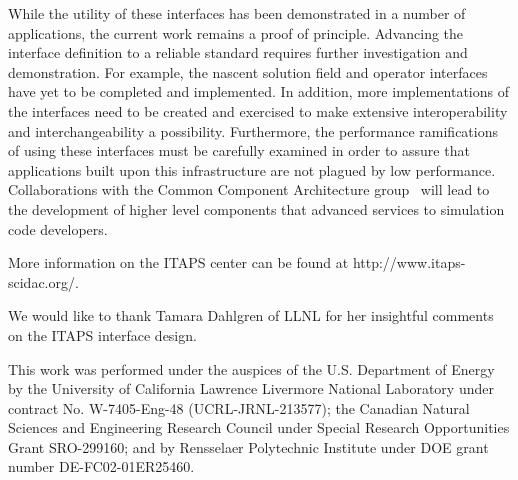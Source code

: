 \documentclass[global]{svjour}
\begin{document}
While the utility of these interfaces has been demonstrated in a
number of applications, the current work remains a proof of principle.
Advancing the interface definition to a reliable standard requires
further investigation and demonstration.  For example, the nascent
solution field and operator interfaces have yet to be completed and
implemented.  In addition, more implementations of the interfaces need
to be created and exercised to make extensive interoperability and
interchangeability a possibility.  Furthermore, the performance
ramifications of using these interfaces must be carefully examined in
order to assure that applications built upon this infrastructure are
not plagued by low performance.  Collaborations with the Common
Component Architecture group~\cite{cca-forum} will lead to the
development of higher level components that advanced services to
simulation code developers.

More information on the ITAPS center can be found at
http://www.itaps-scidac.org/.

\begin{acknowledgement}

We would like to thank Tamara Dahlgren of LLNL for her insightful
comments on the ITAPS interface design.  

This work was performed under the auspices of the U.S. Department of
Energy by the University of California Lawrence Livermore National
Laboratory under contract No. W-7405-Eng-48 (UCRL-JRNL-213577); 
the Canadian Natural Sciences and Engineering Research 
Council under Special Research Opportunities Grant SRO-299160;
and by Rensselaer Polytechnic Institute under DOE grant 
number DE-FC02-01ER25460. 


\end{acknowledgement}





\end{document}
